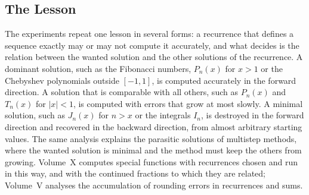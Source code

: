 \begin{table}
\end{table}

\subsection{The Lesson}

The experiments repeat one lesson in several forms: a recurrence that defines a sequence exactly may or may not compute it accurately, and what decides is the relation between the wanted solution and the other solutions of the recurrence. A dominant solution, such as the Fibonacci numbers, $P_n(x)$ for $x>1$ or the Chebyshev polynomials outside $[-1,1]$, is computed accurately in the forward direction. A solution that is comparable with all others, such as $P_n(x)$ and $T_n(x)$ for $|x|<1$, is computed with errors that grow at most slowly. A minimal solution, such as $J_n(x)$ for $n>x$ or the integrals $I_n$, is destroyed in the forward direction and recovered in the backward direction, from almost arbitrary starting values. The same analysis explains the parasitic solutions of multistep methods, where the wanted solution is minimal and the method must keep the others from growing. Volume~X computes special functions with recurrences chosen and run in this way, and with the continued fractions to which they are related; Volume~V analyses the accumulation of rounding errors in recurrences and sums.

